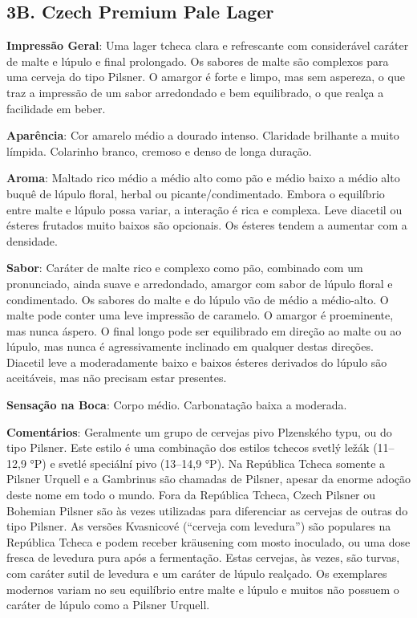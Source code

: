 \subsection*{3B. Czech Premium Pale Lager}

\textbf{Impressão Geral}: Uma lager tcheca clara e refrescante com considerável caráter de malte e lúpulo e final prolongado. Os sabores de malte são complexos para uma cerveja do tipo Pilsner. O amargor é forte e limpo, mas sem aspereza, o que traz a impressão de um sabor arredondado e bem equilibrado, o que realça a facilidade em beber.

\textbf{Aparência}: Cor amarelo médio a dourado intenso. Claridade brilhante a muito límpida. Colarinho branco, cremoso e denso de longa duração.

\textbf{Aroma}: Maltado rico médio a médio alto como pão e médio baixo a médio alto buquê de lúpulo floral, herbal ou picante/condimentado. Embora o equilíbrio entre malte e lúpulo possa variar, a interação é rica e complexa. Leve diacetil ou ésteres frutados muito baixos são opcionais. Os ésteres tendem a aumentar com a densidade.

\textbf{Sabor}: Caráter de malte rico e complexo como pão, combinado com um pronunciado, ainda suave e arredondado, amargor com sabor de lúpulo floral e condimentado. Os sabores do malte e do lúpulo vão de médio a médio-alto. O malte pode conter uma leve impressão de caramelo. O amargor é proeminente, mas nunca áspero. O final longo pode ser equilibrado em direção ao malte ou ao lúpulo, mas nunca é agressivamente inclinado em qualquer destas direções. Diacetil leve a moderadamente baixo e baixos ésteres derivados do lúpulo são aceitáveis, mas não precisam estar presentes.

\textbf{Sensação na Boca}: Corpo médio. Carbonatação baixa a moderada.

\textbf{Comentários}: Geralmente um grupo de cervejas pivo Plzenského typu, ou do tipo Pilsner. Este estilo é uma combinação dos estilos tchecos svetlý ležák (11–12,9 °P) e svetlé speciální pivo (13–14,9 °P). Na República Tcheca somente a Pilsner Urquell e a Gambrinus são chamadas de Pilsner, apesar da enorme adoção deste nome em todo o mundo. Fora da República Tcheca, Czech Pilsner ou Bohemian Pilsner são às vezes utilizadas para diferenciar as cervejas de outras do tipo Pilsner. As versões Kvasnicové (“cerveja com levedura”) são populares na República Tcheca e podem receber kräusening com mosto inoculado, ou uma dose fresca de levedura pura após a fermentação. Estas cervejas, às vezes, são turvas, com caráter sutil de levedura e um caráter de lúpulo realçado. Os exemplares modernos variam no seu equilíbrio entre malte e lúpulo e muitos não possuem o caráter de lúpulo como a Pilsner Urquell.

